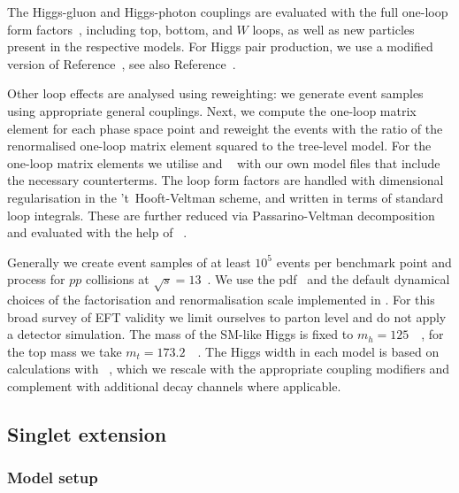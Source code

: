 The Higgs-gluon and Higgs-photon couplings are evaluated with the full
one-loop form fac\-tors~\cite{Djouadi:2005gi}, including top, bottom,
and $W$ loops, as well as new particles present in the respective
models. For Higgs pair production, we use a modified version of
Reference~\cite{higgspaircode}, see also
Reference~\cite{Hespel:2014sla}.

Other loop effects are analysed using reweighting: we generate event
samples using appropriate general couplings. Next, we compute the
one-loop matrix element for each phase space point and reweight the
events with the ratio of the renormalised one-loop matrix element
squared to the tree-level model. For the one-loop matrix elements we
utilise  and ~\cite{Hahn:2000kx}
with our own model files that include the necessary counterterms. The
loop form factors are handled with dimensional regularisation in the
't~Hooft-Veltman scheme, and written in terms of standard loop
integrals. These are further reduced via Passarino-Veltman
decomposition and evaluated with the help of
~\cite{Hahn:1998yk}.

Generally we create event samples of at least $10^5$ events per
benchmark point and process for $pp$ collisions at
$\sqrt{s} = 13$~\tev. We use the 
pdf~\cite{Pumplin:2002vw} and the default dynamical choices of the
factorisation and renormalisation scale implemented in
. For this broad survey of EFT validity we limit
ourselves to parton level and do not apply a detector simulation. The
mass of the SM-like Higgs is fixed to
$m_h = 125$~\gev~\cite{Aad:2015zhl}, for the top mass we take
$m_t = 173.2$~\gev~\cite{Tevatron:2014cka, ATLAS:2014wva}. The Higgs
width in each model is based on calculations with
~\cite{Djouadi:1997yw}, which we rescale with the
appropriate coupling modifiers and complement with additional decay
channels where applicable.



\subsection{Singlet extension}
\label{sec:validity_singlet}

\subsubsection{Model setup}

